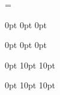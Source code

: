 \documentclass{article}
\begin{document}
\emergencystretch=\maxdimen
{}


\renewcommand{\contentsname}{\normalfont\bfseries\LARGE{CONTENTS}}
\renewcommand{\listfigurename}{\normalfont\bfseries\LARGE{LIST OF FIGURES}}
\renewcommand{\listtablename}{\normalfont\bfseries\LARGE{LIST OF TABLES}}


\titlespacing*{\chapter} {0pt} {0pt} {0pt} %

\titlespacing*{\section} {0pt} {0pt} {0pt}

\titleformat{\subsection}{\normalfont\bfseries}{\thesubsection}{1em}{}
\titlespacing*{\subsection} {0pt} {10pt} {10pt}

\titleformat{\subsubsection}{\normalfont\bfseries}{}{1em}{}
\titlespacing*{\subsubsection} {0pt} {10pt} {10pt}


\pagestyle{fancy}  %
\fancyhf{}  %
\end{document}

